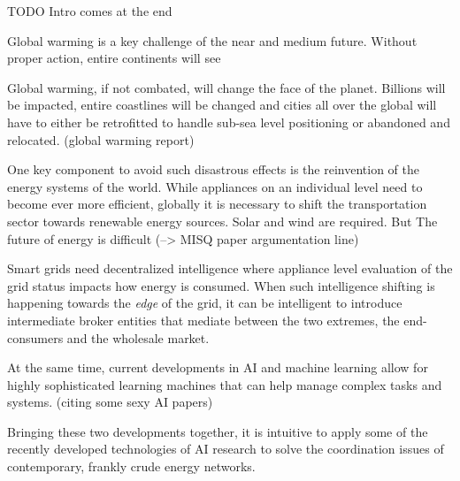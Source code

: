 TODO Intro comes at the end




Global warming is a key challenge of the near and medium future. Without proper action, entire continents will see

Global warming, if not combated, will change the face of the planet. Billions will be impacted, entire coastlines will
be changed and cities all over the global will have to either be retrofitted to handle sub-sea level positioning or
abandoned and relocated. (global warming report)


One key component to avoid such disastrous effects is the reinvention of the energy systems of the world. While
appliances on an individual level need to become ever more efficient, globally it is necessary to shift the
transportation sector towards renewable energy sources.
Solar and wind
are required. But The future of energy is difficult (--> MISQ paper argumentation line)

Smart grids need decentralized intelligence where appliance level evaluation of the grid status impacts how energy is
consumed. When such intelligence shifting is happening towards the \emph{edge} of the grid, it can be intelligent to
introduce intermediate broker entities that mediate between the two extremes, the end-consumers and the wholesale
market.

At the same time, current developments in AI and machine learning allow for highly sophisticated learning machines that
can help manage complex tasks and systems. (citing some sexy AI papers)

Bringing these two developments together, it is intuitive to apply some of the recently developed technologies of 
\ac {AI} research to solve the coordination issues of contemporary, frankly crude energy networks. 
